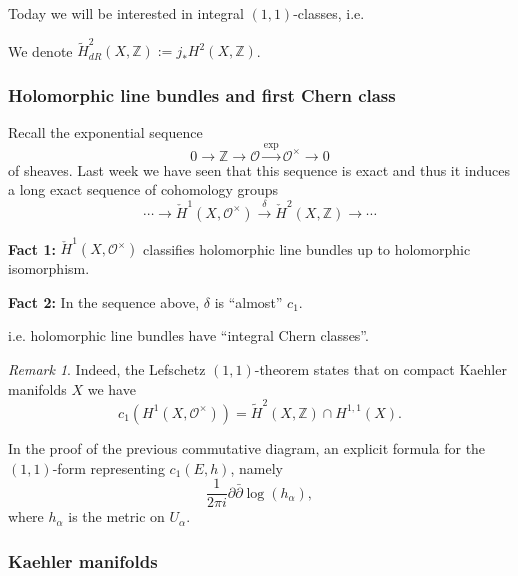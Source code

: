 \documentclass[11pt,A4]{article}
\theoremstyle{plain}
\theoremstyle{definition}
\theoremstyle{remark}
\newtheorem{rem}[thm]{Remark}
\newcommand{\Z}{\mathbb{Z}}
\newcommand{\R}{\mathbb{R}}
\newcommand{\1}{\mathbbm{1}}
\newcommand{\C}{\mathbb{C}}
\renewcommand{\O}{\mathcal{O}}
\begin{document}
Today we will be interested in integral $(1,1)$-classes, i.e.
\begin{center}
\end{center}
We denote $\tilde{H}_{dR}^{2}(X,\Z):= j_{*}H^{2}(X,\Z)$.

\subsubsection{Holomorphic line bundles and first Chern class}

Recall the exponential sequence
\[ 0\to \Z\to \O\xrightarrow{\exp}\O^{\times}\to 0\]
of sheaves.
Last week we have seen that this sequence is exact and thus it induces a long exact sequence of cohomology groups
\[ \cdots \to \check{H}^{1}(X,\O^{\times})\xrightarrow{\delta} \check{H}^{2}(X,\Z)\to \cdots \]

\textbf{Fact 1:} $\check{H}^{1}(X,\O^{\times})$ classifies holomorphic line bundles up to holomorphic isomorphism.

\textbf{Fact 2:} In the sequence above, $\delta$ is ``almost'' $c_{1}$.
\begin{center}
\end{center}
i.e. holomorphic line bundles have ``integral Chern classes''.

\begin{rem}
    Indeed, the Lefschetz $(1,1)$-theorem states that on compact Kaehler manifolds $X$ we have
    \[ c_{1}(H^{1}(X,\O^{\times}))=\tilde{H}^{2}(X,\Z)\cap H^{1,1}(X). \]
\end{rem}

In the proof of the previous commutative diagram, an explicit formula for the $(1,1)$-form representing $c_{1}(E,h)$, namely
\[ \frac{1}{2\pi i}\partial \bar{\partial} \log(h_{\alpha}),\]
where $h_{\alpha}$ is the metric on $U_{\alpha}$.

\subsubsection{Kaehler manifolds}
\end{document}
